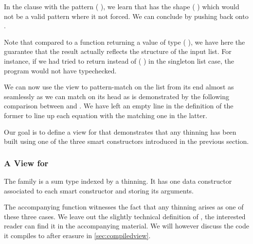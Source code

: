 %
In the clause with the pattern ( \IdrisData{:<} ), we learn
that  has the shape ( \IdrisFunction{++} )
which would not be a valid pattern where it not forced.
%
We can conclude by pushing  back onto .

Note that compared to a function returning a value of type
{ ( \IdrisType{,} )},
we have here the guarantee that the result actually reflects the structure of the
input list.
%
For instance, if we had tried to return  instead of
(\IdrisData{[]} \IdrisData{:<} ) in the singleton list case,
the program would not have typechecked.

We can now use the view to pattern-match on the list from its end almost as
seamlessly as we can match on its head as is demonstrated by the following
comparison between  and .
%
We have left an empty line in the definition of the former to line up each
equation with the matching one in the latter.

\begin{minipage}[t]{0.45\textwidth}
\end{minipage}\hfill
\begin{minipage}[t]{0.45\textwidth}
\end{minipage}

Our goal is to define a view for  that demonstrates
that any thinning has been built using one of the three smart
constructors introduced in the previous section.

\subsubsection{A View for }

The  family is a sum type indexed by a thinning. It has one
data constructor associated to each smart constructor and storing its arguments.


The accompanying  function witnesses the fact that any
thinning arises as one of these three cases.
%
We leave out the slightly technical definition of , the
interested reader can find it in the accompanying material.
%
We will however discuss the code it compiles to after erasure in
\cref{sec:compiledview}.

